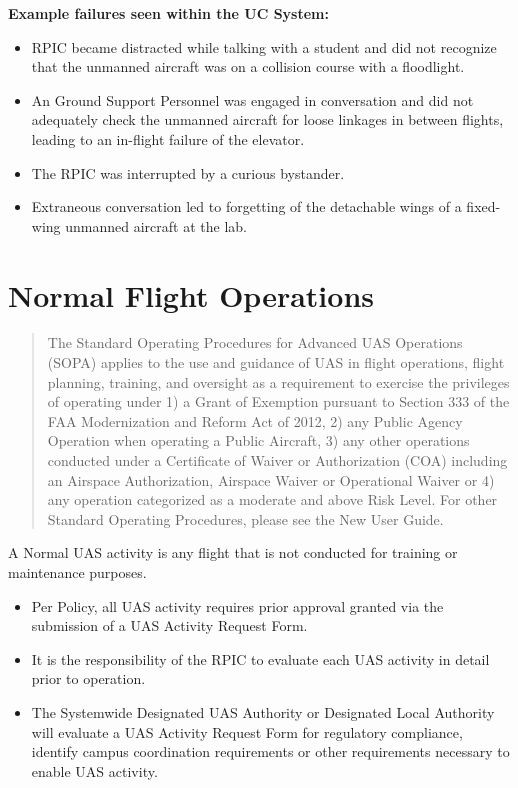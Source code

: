 \documentclass[
]{book}
\providecommand{\tightlist}{%
  \setlength{\itemsep}{0pt}\setlength{\parskip}{0pt}}
\begin{document}
\textbf{Example failures seen within the UC System:}

\begin{itemize}
\tightlist
\item
  RPIC became distracted while talking with a student and did not recognize that the unmanned aircraft was on a collision course with a floodlight.
\item
  An Ground Support Personnel was engaged in conversation and did not adequately check the unmanned aircraft for loose linkages in between flights, leading to an in-flight failure of the elevator.
\item
  The RPIC was interrupted by a curious bystander.
\item
  Extraneous conversation led to forgetting of the detachable wings of a fixed-wing unmanned aircraft at the lab.
\end{itemize}

\chapter{Normal Flight Operations}\label{normal-flight-operations}

\begin{quote}
The Standard Operating Procedures for Advanced UAS Operations (SOPA) applies to the use and guidance of UAS in flight operations, flight planning, training, and oversight as a requirement to exercise the privileges of operating under 1) a Grant of Exemption pursuant to Section 333 of the FAA Modernization and Reform Act of 2012, 2) any Public Agency Operation when operating a Public Aircraft, 3) any other operations conducted under a Certificate of Waiver or Authorization (COA) including an Airspace Authorization, Airspace Waiver or Operational Waiver or 4) any operation categorized as a moderate and above Risk Level. For other Standard Operating Procedures, please see the New User Guide.
\end{quote}

A Normal UAS activity is any flight that is not conducted for training or maintenance purposes.

\begin{itemize}
\tightlist
\item
  Per Policy, all UAS activity requires prior approval granted via the submission of a UAS Activity Request Form.
\item
  It is the responsibility of the RPIC to evaluate each UAS activity in detail prior to operation.
\item
  The Systemwide Designated UAS Authority or Designated Local Authority will evaluate a UAS Activity Request Form for regulatory compliance, identify campus coordination requirements or other requirements necessary to enable UAS activity.
\end{itemize}
\end{document}

